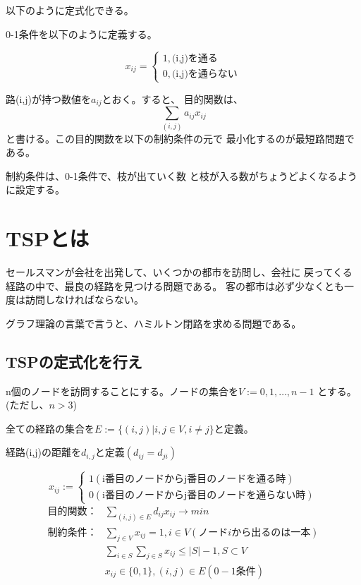 \documentclass[9pt]{ltjsarticle}
\begin{document}
    以下のように定式化できる。

    \hrulefill
    
    0-1条件を以下のように定義する。
    \begin{tcolorbox}[title=0-1条件]
        \begin{equation}
            x_{ij}=\begin{cases}
                1 , \text{(i,j)を通る}\\
                0 , \text{(i,j)を通らない}
            \end{cases}
        \end{equation}
    \end{tcolorbox}
    路(i,j)が持つ数値を$a_{ij}$とおく。すると、
    目的関数は、
    \begin{equation}
        \sum_{(i,j)} a_{ij}x_{ij}
    \end{equation}
    と書ける。この目的関数を以下の制約条件の元で
    最小化するのが最短路問題である。
    
    制約条件は、0-1条件で、枝が出ていく数
    と枝が入る数がちょうどよくなるように設定する。
    
\newpage
\section{TSPとは}
セールスマンが会社を出発して、いくつかの都市を訪問し、会社に
戻ってくる経路の中で、最良の経路を見つける問題である。
客の都市は必ず少なくとも一度は訪問しなければならない。

グラフ理論の言葉で言うと、ハミルトン閉路を求める問題である。

\subsection{TSPの定式化を行え}
\begin{tcolorbox}[title=巡回セールス問題の定式化]
    n個のノードを訪問することにする。ノードの集合を$V:={0,1,\dots,n-1}$
    とする。(ただし、$n>3$)

    全ての経路の集合を$E:=\{(i,j)|i,j\in V,i\neq j\}$と定義。

    経路(i,j)の距離を$d_{i,j}$と定義$(d_{ij}=d_{ji})$

    \begin{equation}
        x_{ij}:=\begin{cases}
            1 (\text{i番目のノードからj番目のノードを通る時})\\
            0 (\text{i番目のノードからj番目のノードを通らない時})
        \end{cases}
    \end{equation}
    \begin{align}
        \text{目的関数：}&\sum_{(i,j)\in E}d_{ij}x_{ij}\longrightarrow min\\
        \text{制約条件：}&\sum_{j\in V}x_{ij}=1,i\in V(ノードiから出るのは一本)\\
        &\sum_{i\in S}\sum_{j\in S}x_{ij}\le |S|-1,S\subset V\\
        &x_{ij}\in \{0,1\},(i,j)\in E(0-1\text{条件})
    \end{align}
\end{tcolorbox}
\end{document}
